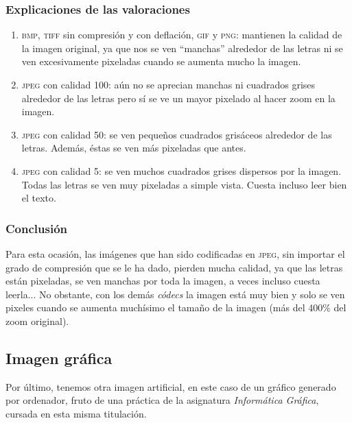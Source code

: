 \documentclass[11pt,a4paper]{article}
\begin{document}
\subsubsection{Explicaciones de las valoraciones}
\begin{enumerate}
	\item \textsc{bmp}, \textsc{tiff} sin compresión y con deflación, \textsc{gif} y \textsc{png}: mantienen la calidad de la imagen original, ya que nos se ven ``manchas'' alrededor de las letras ni se ven excesivamente pixeladas cuando se aumenta mucho la imagen.
	\item \textsc{jpeg} con calidad 100: aún no se aprecian manchas ni cuadrados grises alrededor de las letras pero sí se ve un mayor pixelado al hacer zoom en la imagen.
	\item \textsc{jpeg} con calidad 50: se ven pequeños cuadrados grisáceos alrededor de las letras. Además, éstas se ven más pixeladas que antes.
	\item \textsc{jpeg} con calidad 5: se ven muchos cuadrados grises dispersos por la imagen. Todas las letras se ven muy pixeladas a simple vista. Cuesta incluso leer bien el texto.
\end{enumerate}

\subsubsection{Conclusión}

Para esta ocasión, las imágenes que han sido codificadas en \textsc{jpeg}, sin importar el grado de compresión que se le ha dado, pierden mucha calidad, ya que las letras están pixeladas, se ven manchas por toda la imagen, a veces incluso cuesta leerla... No obstante, con los demás \textit{códecs} la imagen está muy bien y solo se ven pixeles cuando se aumenta muchísimo el tamaño de la imagen (más del 400\% del zoom original).

\newpage

\subsection{Imagen gráfica}

Por último, tenemos otra imagen artificial, en este caso de un gráfico generado por ordenador, fruto de una práctica de la asignatura \textit{Informática Gráfica}, cursada en esta misma titulación.
\end{document}
